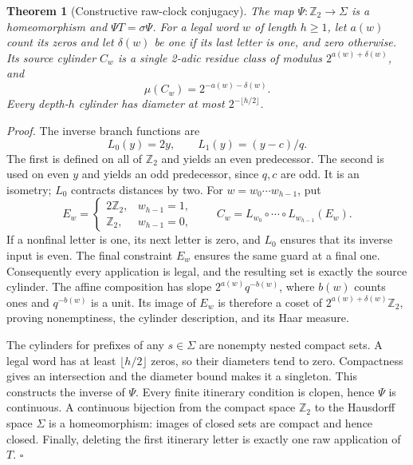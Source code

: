 \documentclass[11pt,letterpaper]{article}
\newcommand{\Z}{\mathbb{Z}}
\newtheorem{theorem}{Theorem}
\newenvironment{proof}{\noindent\textit{Proof.}}{\hfill\(\square\)}
\begin{document}
\begin{theorem}[Constructive raw-clock conjugacy]
\label{thm:conjugacy}
The map \(\Psi:\Z_2\to\Sigma\) is a homeomorphism and
\(\Psi T=\sigma\Psi\). For a legal word \(w\) of length \(h\ge1\),
let \(a(w)\) count its zeros and let \(\delta(w)\) be one if its last
letter is one, and zero otherwise. Its source cylinder \(C_w\) is a
single 2-adic residue class of modulus \(2^{a(w)+\delta(w)}\), and
\[
\mu(C_w)=2^{-a(w)-\delta(w)}.
\]
Every depth-\(h\) cylinder has diameter at most
\(2^{-\lfloor h/2\rfloor}\).
\end{theorem}

\begin{proof}
The inverse branch functions are
\[
L_0(y)=2y,\qquad L_1(y)=(y-c)/q.
\]
The first is defined on all of \(\Z_2\) and yields an even predecessor.
The second is used on even \(y\) and yields an odd predecessor, since
\(q,c\) are odd. It is an isometry; \(L_0\) contracts distances by two.
For \(w=w_0\cdots w_{h-1}\), put
\[
E_w=\begin{cases}2\Z_2,&w_{h-1}=1,\\\Z_2,&w_{h-1}=0,\end{cases}
\qquad
C_w=L_{w_0}\circ\cdots\circ L_{w_{h-1}}(E_w).
\]
If a nonfinal letter is one, its next letter is zero, and \(L_0\)
ensures that its inverse input is even. The final constraint \(E_w\)
ensures the same guard at a final one. Consequently every application
is legal, and the resulting set is exactly the source cylinder.
The affine composition has slope \(2^{a(w)}q^{-b(w)}\), where \(b(w)\)
counts ones and \(q^{-b(w)}\) is a unit. Its image of \(E_w\) is
therefore a coset of \(2^{a(w)+\delta(w)}\Z_2\), proving nonemptiness,
the cylinder description, and its Haar measure.

The cylinders for prefixes of any \(s\in\Sigma\) are nonempty nested
compact sets. A legal word has at least \(\lfloor h/2\rfloor\) zeros,
so their diameters tend to zero. Compactness gives an intersection and
the diameter bound makes it a singleton. This constructs the inverse
of \(\Psi\). Every finite itinerary condition is clopen, hence
\(\Psi\) is continuous. A continuous bijection from the compact
space \(\Z_2\) to the Hausdorff space \(\Sigma\) is a homeomorphism:
images of closed sets are compact and hence closed. Finally, deleting
the first itinerary letter is exactly one raw application of \(T\).
\end{proof}
\end{document}
